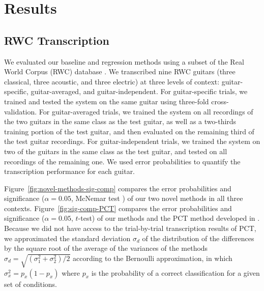 \documentclass[convention,peer-reviewed]{aesconf}
\begin{document}
\section{Results}  
\subsection{RWC Transcription}
We evaluated our baseline and regression methods using a subset of the Real World Corpus (RWC) database \citep{goto2003}. We transcribed nine RWC guitars (three classical, three acoustic, and three electric) at three levels of context: guitar-specific, guitar-averaged, and guitar-independent. For guitar-specific trials, we trained and tested the system on the same guitar using three-fold cross-validation. For guitar-averaged trials, we trained the system on all recordings of the two guitars in the same class as the test guitar, as well as a two-thirds training portion of the test guitar, and then evaluated on the remaining third of the test guitar recordings. For guitar-independent trials, we trained the system on two of the guitars in the same class as the test guitar, and tested on all recordings of the remaining one. We used error probabilities to quantify the transcription performance for each guitar.

Figure~\ref{fig:novel-methods-sig-comp} compares the error probabilities and significance ($\alpha = 0.05$, McNemar test \citep{McNemar1947}) of our two novel methods in all three contexts. Figure~\ref{fig:sig-comp-PCT} compares the error probabilities and significance ($\alpha = 0.05$, $t$-test) of our methods and the PCT method developed in \citep{barbanchoi2012}. Because we did not have access to the trial-by-trial transcription results of PCT, we approximated the standard deviation $\sigma_d$ of the distribution of the differences by the square root of the average of the variances of the methods $\sigma_d = \sqrt{(\sigma^2_1+\sigma^2_2)/2}$ according to the Bernoulli approximation, in which $\sigma_x^2 = p_x(1-p_x)$ where $p_x$ is the probability of a correct classification for a given set of conditions.
\end{document}

